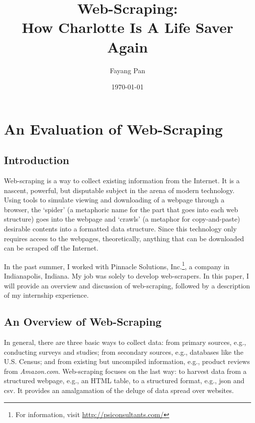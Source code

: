 \documentclass[12pt]{report}
\begin{document}
\lstset{language=Python,
basicstyle=\ttfamily,
commentstyle=\textit,
breaklines=true,
numbersep=5pt,
xleftmargin=.25in,
xrightmargin=.25in,
columns=fullflexible,
showstringspaces=false}
\title{Web-Scraping:\\ How Charlotte Is A Life Saver Again}
\author{Fayang Pan}
\date{\today}
\maketitle
\tableofcontents
\listoffigures

\chapter{An Evaluation of Web-Scraping}
\section*{Introduction}

\indent Web-scraping is a way to collect existing information from the Internet. It is a nascent, powerful, but disputable subject in the arena of modern technology. Using tools to simulate viewing and downloading of a webpage through a browser, the `spider' (a metaphoric name for the part that goes into each web structure) goes into the webpage and `crawls' (a metaphor for copy-and-paste) desirable contents into a formatted data structure. Since this technology only requires access to the webpages, theoretically, anything that can be downloaded can be scraped off the Internet.

In the past summer, I worked with Pinnacle Solutions, Inc.\footnote{For information, visit \url{http://psiconsultants.com/}}, a company in Indianapolis, Indiana. My job was solely to develop web-scrapers. In this paper, I will provide an overview and discussion of web-scraping, followed by a description of my internship experience.

\section{An Overview of Web-Scraping}
In general, there are three basic ways to collect data: from primary sources, e.g., conducting surveys and studies; from secondary sources, e.g., databases like the U.S. Census; and from existing but uncompiled information, e.g., product reviews from \textit{Amazon.com}. Web-scraping focuses on the last way: to \gls{harvest} data from a structured webpage, e.g., an HTML table, to a structured format, e.g., \gls{json} and \gls{csv}. It provides an amalgamation of the deluge of data spread over websites.
\end{document}
